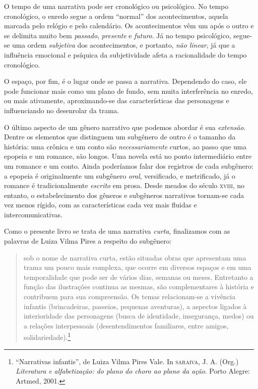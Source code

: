 \documentclass[11pt]{extarticle}
\begin{document}
O tempo de uma narrativa pode ser cronológico ou psicológico.
No tempo cronológico, o enredo segue a ordem ``normal'' dos acontecimentos,
aquela marcada pelo relógio e pelo calendário. Os acontecimentos vêm um após o 
outro e se delimita muito bem \textit{passado}, \textit{presente} e \textit{futuro}.
Já no tempo psicológico, segue-se uma ordem \textit{subjetiva} dos acontecimentos, 
e portanto, \textit{não linear}, já que a influência emocional e psíquica 
da subjetividade afeta a racionalidade do tempo cronológico. 

O espaço, por fim, é o lugar onde se passa a narrativa. Dependendo do caso, 
ele pode funcionar mais como um plano de fundo, sem muita interferência
no enredo, ou mais ativamente, aproximando-se das características das personagens
e influenciando no desenrolar da trama. 

O último aspecto de um gênero narrativo que podemos abordar é sua 
\textit{extensão}. Dentre os elementos que distinguem um subgênero 
de outro é o tamanho da história: uma crônica e um conto são \textit{necessariamente}
curtos, ao passo que uma epopeia e um romance, são longos. Uma novela
está no ponto intermediário entre um romance e um conto.
Ainda poderíamos falar dos registros de cada subgênero: 
a epopeia é originalmente um subgênero \textit{oral}, versificado, e metrificado,
já o romance é tradicionalmente \textit{escrito} em prosa. 
Desde meados do século \textsc{xviii}, no entanto, o estabelecimento
dos gêneros e subgêneros narrativos tornam-se cada vez menos rígido,
com as características cada vez mais fluidas e intercomunicativas.

Como o presente livro se trata de uma narrativa \textit{curta},
finalizamos com as palavras de Luiza Vilma Pires a respeito do
subgênero:

\begin{quote}
sob o nome de narrativa curta, estão situadas obras que apresentam uma trama 
um pouco mais complexa, que ocorre em diversos espaços e em uma temporalidade 
que pode ser de vários dias, semanas ou meses. Entretanto a função das ilustrações 
continua as mesmas, são complementares à história e contribuem para sua compreensão. 
Os temas relacionam-se a vivência infantis (brincadeiras, passeios, pequenas aventuras), 
a aspectos ligados à interioridade das personagens (busca de identidade, insegurança, 
medos) ou a relações interpessoais (desentendimentos familiares, entre amigos, solidariedade).\footnote{“Narrativas infantis”, de Luiza Vilma Pires Vale. In \textsc{saraiva}, J. A. (Org.) \textit{Literatura e alfabetização: do plano do choro ao plano da ação}. Porto Alegre: Artmed, 2001.} 
\end{quote}
 
\end{document}

